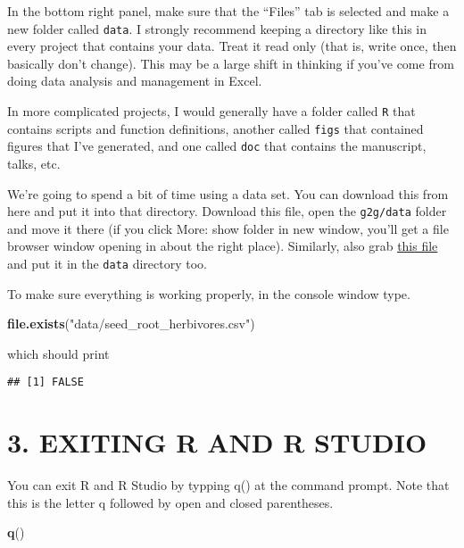 \documentclass[]{article}
\newenvironment{Shaded}{\begin{snugshade}}{\end{snugshade}}
\newcommand{\KeywordTok}[1]{\textcolor[rgb]{0.13,0.29,0.53}{\textbf{#1}}}
\newcommand{\StringTok}[1]{\textcolor[rgb]{0.31,0.60,0.02}{#1}}
\newcommand{\NormalTok}[1]{#1}
\begin{document}
In the bottom right panel, make sure that the ``Files'' tab is selected
and make a new folder called \texttt{data}. I strongly recommend keeping
a directory like this in every project that contains your data. Treat it
read only (that is, write once, then basically don't change). This may
be a large shift in thinking if you've come from doing data analysis and
management in Excel.

In more complicated projects, I would generally have a folder called
\texttt{R} that contains scripts and function definitions, another
called \texttt{figs} that contained figures that I've generated, and one
called \texttt{doc} that contains the manuscript, talks, etc.

We're going to spend a bit of time using a data set. You can download
this from here and put it into that directory. Download this file, open
the \texttt{g2g/data} folder and move it there (if you click More: show
folder in new window, you'll get a file browser window opening in about
the right place). Similarly, also grab
\href{https://nicercode.github.io/intro/data/seed_root_herbivores.txt}{this
file} and put it in the \texttt{data} directory too.

To make sure everything is working properly, in the console window type.

\begin{Shaded}
\begin{Highlighting}[]
\KeywordTok{file.exists}\NormalTok{(}\StringTok{"data/seed_root_herbivores.csv"}\NormalTok{)}
\end{Highlighting}
\end{Shaded}

which should print

\begin{verbatim}
## [1] FALSE
\end{verbatim}

\section{3. EXITING R AND R STUDIO}\label{exiting-r-and-r-studio}

You can exit R and R Studio by typping q() at the command prompt. Note
that this is the letter q followed by open and closed parentheses.

\begin{Shaded}
\begin{Highlighting}[]
\KeywordTok{q}\NormalTok{()}
\end{Highlighting}
\end{Shaded}
\end{document}
